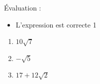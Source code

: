 %
%
    Évaluation :
    \begin{itemize}
        \item L'expression est correcte \hfill 1
    \end{itemize}
\begin{enumerate}[cols=3]
    \item $10 \sqrt{7}$
    \item $-\sqrt{5}$
    \item $17+12\sqrt{2}$
\end{enumerate}
